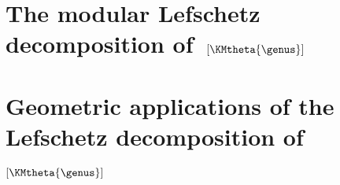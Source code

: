\documentclass[11pt,a4paper,notitlepage,oneside]{amsart}
\begin{document}
	\section{The modular Lefschetz decomposition of~$[\KMtheta{\genus}]$}\label{sec;gen2}
	
%	
	\section{Geometric applications of the Lefschetz decomposition of~$[\KMtheta{\genus}]$}\label{sec;appgen1}
	
%	
	
	\printbibliography
	
\end{document}
